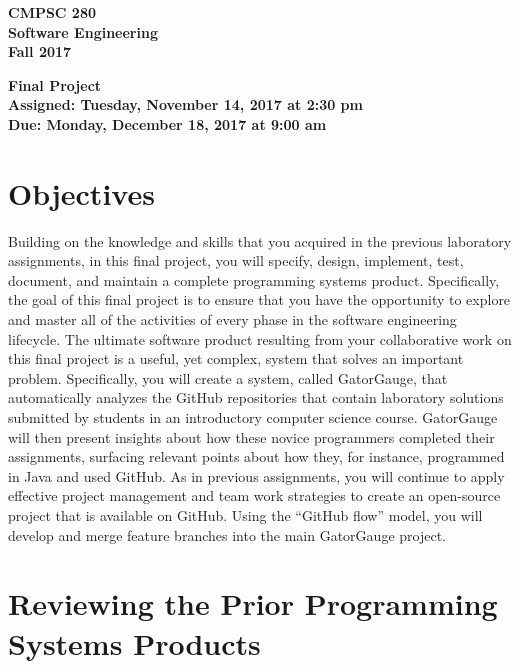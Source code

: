 \documentclass[11pt]{article}
\newcommand{\assignmentduedate}{December 18}
\newcommand{\assignmentassignedate}{November 14}
\newcommand{\labyear}{2017}
\newcommand{\labday}{Tuesday}
\newcommand{\labdueday}{Monday}
\newcommand{\labtime}{2:30 pm}
\newcommand{\labduetime}{9:00 am}
\newcommand{\assigneddate}{Assigned: \labday, \assignmentassignedate, \labyear{} at \labtime{}}
\newcommand{\duedate}{Due: \labdueday, \assignmentduedate, \labyear{} at \labduetime{}}
\newcommand{\labtitle}[1]
{
  \begin{center}
    \begin{center}
      \bf
      CMPSC 280\\Software Engineering\\
      Fall 2017\\
      \medskip
    \end{center}
    \bf
    #1
  \end{center}
}
\begin{document}
\thispagestyle{empty}

\labtitle{Final Project \\ \assigneddate{} \\ \duedate{}}

\section*{Objectives}


Building on the knowledge and skills that you acquired in the previous laboratory assignments, in this final project,
you will specify, design, implement, test, document, and maintain a complete programming systems product. Specifically,
the goal of this final project is to ensure that you have the opportunity to explore and master all of the activities of
every phase in the software engineering lifecycle. The ultimate software product resulting from your collaborative work
on this final project is a useful, yet complex, system that solves an important problem. Specifically, you will create a
system, called GatorGauge, that automatically analyzes the GitHub repositories that contain laboratory solutions
submitted by students in an introductory computer science course. GatorGauge will then present insights about how these
novice programmers completed their assignments, surfacing relevant points about how they, for instance, programmed in
Java and used GitHub. As in previous assignments, you will continue to apply effective project management and team work
strategies to create an open-source project that is available on GitHub. Using the ``GitHub flow'' model, you will
develop and merge feature branches into the main GatorGauge project.

\section*{Reviewing the Prior Programming Systems Products}
\end{document}
